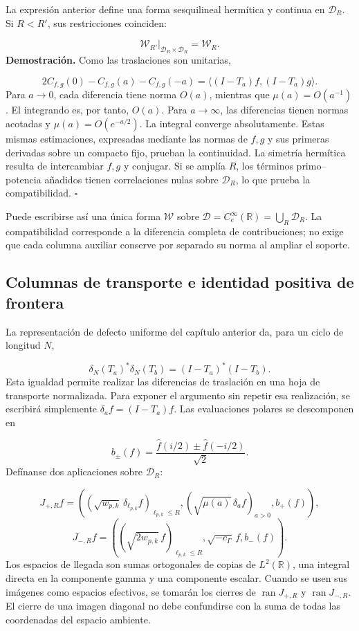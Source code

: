 La expresión anterior define una forma sesquilineal hermítica y continua en \(\mathcal D_R\). Si \(R<R'\), sus restricciones coinciden:

\[
\mathscr W_{R'}|_{\mathcal D_R\times\mathcal D_R}=\mathscr W_R.
\]
\textbf{Demostración.} Como las traslaciones son unitarias,

\[
2C_{f,g}(0)-C_{f,g}(a)-C_{f,g}(-a)
=\langle(I-T_a)f,(I-T_a)g\rangle.
\]
Para \(a\to0\), cada diferencia tiene norma \(O(a)\), mientras que \(\mu(a)=O(a^{-1})\). El integrando es, por tanto, \(O(a)\). Para \(a\to\infty\), las diferencias tienen normas acotadas y \(\mu(a)=O(e^{-a/2})\). La integral converge absolutamente. Estas mismas estimaciones, expresadas mediante las normas de \(f,g\) y sus primeras derivadas sobre un compacto fijo, prueban la continuidad. La simetría hermítica resulta de intercambiar \(f,g\) y conjugar. Si se amplía \(R\), los términos primo–potencia añadidos tienen correlaciones nulas sobre \(\mathcal D_R\), lo que prueba la compatibilidad. \hfill\(\square\)

Puede escribirse así una única forma \(\mathscr W\) sobre \(\mathcal D=C_c^\infty(\mathbb R)=\bigcup_R\mathcal D_R\). La compatibilidad corresponde a la diferencia completa de contribuciones; no exige que cada columna auxiliar conserve por separado su norma al ampliar el soporte.

\subsection{Columnas de transporte e identidad positiva de frontera}
\label{rz:columnas}
La representación de defecto uniforme del capítulo anterior da, para un ciclo de longitud \(N\),

\[
\delta_N(T_a)^*\delta_N(T_b)=(I-T_a)^*(I-T_b).
\]
Esta igualdad permite realizar las diferencias de traslación en una hoja de transporte normalizada. Para exponer el argumento sin repetir esa realización, se escribirá simplemente \(\delta_af=(I-T_a)f\). Las evaluaciones polares se descomponen en

\[
b_\pm(f)=\frac{\widehat f(i/2)\pm\widehat f(-i/2)}{\sqrt2}.
\]
Defínanse dos aplicaciones sobre \(\mathcal D_R\):

\[
J_{+,R}f=
\left(
(\sqrt{w_{p,k}}\,\delta_{\ell_{p,k}}f)_{\ell_{p,k}\leq R},
(\sqrt{\mu(a)}\,\delta_af)_{a>0},
b_+(f)
\right),
\]
\[
J_{-,R}f=
\left(
(\sqrt{2w_{p,k}}\,f)_{\ell_{p,k}\leq R},
\sqrt{-c_\Gamma}\,f,
b_-(f)
\right).
\]
Los espacios de llegada son sumas ortogonales de copias de \(L^2(\mathbb R)\), una integral directa en la componente gamma y una componente escalar. Cuando se usen sus imágenes como espacios efectivos, se tomarán los cierres de \(\operatorname{ran}J_{+,R}\) y \(\operatorname{ran}J_{-,R}\). El cierre de una imagen diagonal no debe confundirse con la suma de todas las coordenadas del espacio ambiente.

